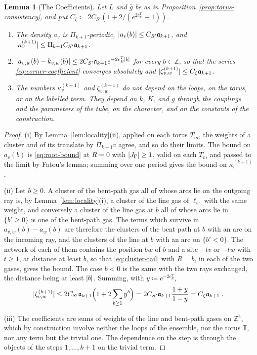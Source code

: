 \documentclass[11pt]{preprint}
\DeclarePairedDelimiter{\abs}{\lvert}{\rvert}
\numberwithin{equation}{section}
\newtheorem{lemma}[theorem]{Lemma}
\theoremstyle{definition}
\theoremstyle{remark}
\theoremstyle{plain}
\begin{document}
\begin{lemma}[The Coefficients]\label{lem:coefficients}
Let $L$ and $\bar g$ be as in Proposition~\ref{prop:torus-consistency}, and put $C_\zeta \coloneqq 2C_{S'}(1 + 2/(e^{2c^T_E} - 1))$.
\begin{enumerate}[label=(\roman*)]
\item The density $a_v$ is $\Pi_{k+1}$-periodic, $\abs{a_v(b)} \leq C_{S'}\mathfrak a_{k+1}$, and $\abs{\kappa^{(k+1)}_v} \leq \Pi_{k+1}C_{S'}\mathfrak a_{k+1}$.
\item $\abs{a_{v,w}(b) - k_{v,w}(b)} \leq 2C_{S'}\mathfrak a_{k+1}e^{-2c^T_E\abs{b}}$ for every $b \in \mathbb Z$, so that the series \eqref{eq:corner-coefficient} converges absolutely and $\abs{\zeta^{(k+1)}_{v,w}} \leq C_\zeta\mathfrak a_{k+1}$.
\item The numbers $\kappa^{(k+1)}_v$ and $\zeta^{(k+1)}_{v,w}$ do not depend on the loops, on the torus, or on the labelled term. They depend on $k$, $K$, and $\bar g$ through the couplings and the parameters of the tube, on the character, and on the constants of the construction.
\end{enumerate}
\end{lemma}

\begin{proof}
(i) By Lemma~\ref{lem:locality}(ii), applied on each torus $T_m$, the weights of a cluster and of its translate by $\Pi_{k+1}v$ agree, and so do their limits. The bound on $a_v(b)$ is \eqref{eq:root-bound} at $R = 0$ with $\abs{J_\Gamma} \geq 1$, valid on each $T_m$ and passed to the limit by Fatou's lemma; summing over one period gives the bound on $\kappa^{(k+1)}_v$.

(ii) Let $b \geq 0$. A cluster of the bent-path gas all of whose arcs lie on the outgoing ray is, by Lemma~\ref{lem:locality}(i), a cluster of the line gas of $\ell_w$ with the same weight, and conversely a cluster of the line gas at $b$ all of whose arcs lie in $\{ b' \geq 0 \}$ is one of the bent-path gas. The terms which survive in $a_{v,w}(b) - a_w(b)$ are therefore the clusters of the bent path at $b$ with an arc on the incoming ray, and the clusters of the line at $b$ with an arc on $\{ b' < 0 \}$. The network of each of them contains the position $bw$ of $b$ and a site $-tv$ or $-tw$ with $t \geq 1$, at distance at least $b$, so that \eqref{eq:cluster-tail} with $R = b$, in each of the two gases, gives the bound. The case $b < 0$ is the same with the two rays exchanged, the distance being at least $\abs{b}$. Summing, with $y \coloneqq e^{-2c^T_E}$,
\begin{equation}\label{eq:corner-coefficient-bound}
    \abs{\zeta^{(k+1)}_{v,w}} \leq 2C_{S'}\mathfrak a_{k+1}\Bigl(1 + 2\sum_{b \geq 1}y^b\Bigr) = 2C_{S'}\mathfrak a_{k+1}\frac{1 + y}{1 - y} = C_\zeta\mathfrak a_{k+1}\;.
\end{equation}

(iii) The coefficients are sums of weights of the line and bent-path gases on $\mathbb Z^4$, which by construction involve neither the loops of the ensemble, nor the torus $\mathbb T$, nor any term but the trivial one. The dependence on the step is through the objects of the steps $1, \dots, k + 1$ on the trivial term.
\end{proof}
\end{document}
